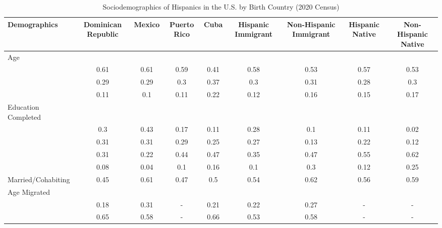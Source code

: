 \begin{table}[ht]
\centering
\caption{Sociodemographics of Hispanics in the U.S. by Birth Country (2020 Census)} 
\begingroup\small
\begin{tabular}{>{\raggedright\arraybackslash}p{3.2cm}|cccccccc}
  \hline
Demographics & Dominican Republic & Mexico & Puerto Rico & Cuba & Hispanic Immigrant & Non-Hispanic Immigrant & Hispanic Native & Non-Hispanic Native \\ 
  \hline
Age &  &  &  &  &  &  &  &  \\ 
  \multicolumn{1}{>{\raggedleft\arraybackslash}p{1.5cm}|}{\makebox[1.5cm][r]{60 - 69 }}& 0.61 & 0.61 & 0.59 & 0.41 & 0.58 & 0.53 & 0.57 & 0.53 \\ 
  \multicolumn{1}{>{\raggedleft\arraybackslash}p{1.5cm}|}{\makebox[1.5cm][r]{70 - 79 }}& 0.29 & 0.29 & 0.3 & 0.37 & 0.3 & 0.31 & 0.28 & 0.3 \\ 
  \multicolumn{1}{>{\raggedleft\arraybackslash}p{1.5cm}|}{\makebox[1.5cm][r]{80 - 89 }}& 0.11 & 0.1 & 0.11 & 0.22 & 0.12 & 0.16 & 0.15 & 0.17 \\ 
  Education Completed &  &  &  &  &  &  &  &  \\ 
  \multicolumn{1}{>{\raggedleft\arraybackslash}p{3.2cm}|}{\makebox[3.2cm][r]{Less than Primary }}& 0.3 & 0.43 & 0.17 & 0.11 & 0.28 & 0.1 & 0.11 & 0.02 \\ 
  \multicolumn{1}{>{\raggedleft\arraybackslash}p{1.7cm}|}{\makebox[1.7cm][r]{Primary }}& 0.31 & 0.31 & 0.29 & 0.25 & 0.27 & 0.13 & 0.22 & 0.12 \\ 
  \multicolumn{1}{>{\raggedleft\arraybackslash}p{2cm}|}{\makebox[2cm][r]{Secondary }}& 0.31 & 0.22 & 0.44 & 0.47 & 0.35 & 0.47 & 0.55 & 0.62 \\ 
  \multicolumn{1}{>{\raggedleft\arraybackslash}p{2cm}|}{\makebox[2cm][r]{University }}& 0.08 & 0.04 & 0.1 & 0.16 & 0.1 & 0.3 & 0.12 & 0.25 \\ 
  Married/Cohabiting & 0.45 & 0.61 & 0.47 & 0.5 & 0.54 & 0.62 & 0.56 & 0.59 \\ 
  Age Migrated &  &  &  &  &  &  &  &  \\ 
  \multicolumn{1}{>{\raggedleft\arraybackslash}p{2.4cm}|}{\makebox[2.4cm][r]{Less than 15 }}& 0.18 & 0.31 & - & 0.21 & 0.22 & 0.27 & - & - \\ 
  \multicolumn{1}{>{\raggedleft\arraybackslash}p{1.6cm}|}{\makebox[1.6cm][r]{15 - 49 }}& 0.65 & 0.58 & - & 0.66 & 0.53 & 0.58 & - & - \\ 

\end{tabular}
\end{table}
